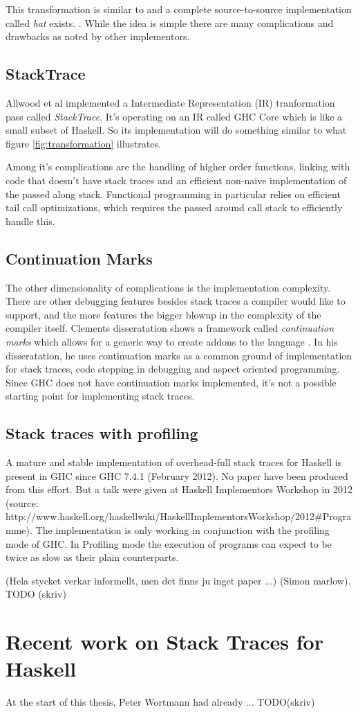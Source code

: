 This transformation is similar to
\cite{ghc_wiki_explicitcs_transformation}  and a complete
source-to-source implementation called \emph{hat} exists.
\cite{hat_website}.  While the idea is simple there are many
complications and drawbacks as noted by other implementors.

\subsection{StackTrace}

Allwood et al implemented a Intermediate Representation (IR) tranformation
pass called \emph{StackTrace}. It's operating on an IR called GHC Core which
is like a small subset of Haskell. So its implementation will do something
similar to what figure \ref{fig:transformation} illustrates.

Among it's complications are the
handling of higher order functions, linking with code that doesn't have stack
traces and an efficient non-naive implementation of the
passed along stack. \cite{FindingTheNeedle2009}
Functional programming in particular relies on efficient tail call
optimizations, which
requires the passed around call stack to efficiently handle this.

\subsection{Continuation Marks}

The other dimensionality of complications is the implementation
complexity.  There are other debugging features besides stack traces a
compiler would like to support, and the more features the bigger blowup
in the complexity of the compiler itself.  Clements disseratation shows
a framework called \emph{continuation marks} which allows for a generic
way to create addons to the language \cite{clements_dissertation2005}.
In his disseratation, he uses continuation marks as a common ground of
implementation for stack traces, code stepping in debugging and aspect
oriented programming.  Since GHC does not have continuation marks
implemented, it's not a possible starting point for implementing stack
traces.

\subsection{Stack traces with profiling}

A mature and stable implementation of overhead-full stack traces for
Haskell is present in GHC since GHC 7.4.1 (February 2012). No paper have
been produced from this effort. But a talk were given at Haskell
Implementors Workshop in 2012 (source: http://www.haskell.org/haskellwiki/HaskellImplementorsWorkshop/2012#Programme).
The implementation is only working in conjunction with the profiling
mode of GHC. In Profiling mode the execution of programs can expect to
be twice as slow as their plain counterparts.

(Hela stycket verkar informellt, men det finns ju inget paper ...)
(Simon marlow). TODO (skriv) %


\section{Recent work on Stack Traces for Haskell} \label{sec:recent_work}

At the start of this thesis, Peter Wortmann had already ... TODO(skriv) %
